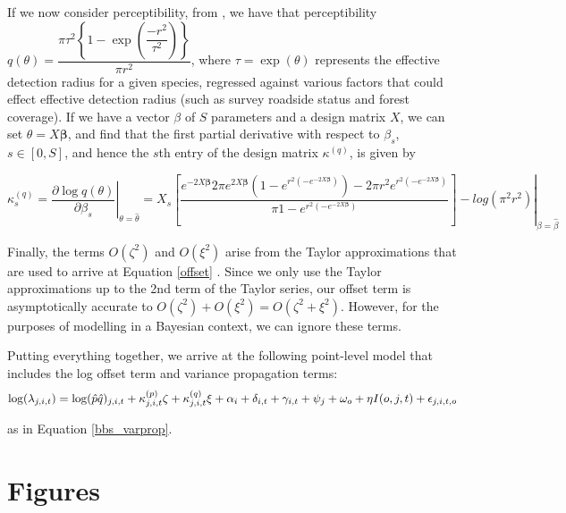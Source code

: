 \documentclass[12pt]{article}
\begin{document}
\par If we now consider perceptibility, from \citet{solymos_calibrating_2013}, we have that perceptibility $q(\theta) = \dfrac{\pi \tau^2 \left\{1 - \exp\left(\dfrac{-r^2}{\tau^2}\right)\right\}}{\pi r^2}$, where $\tau = \exp(\theta)$ represents the effective detection radius for a given species, regressed against various factors that could effect effective detection radius (such as survey roadside status and forest coverage). 
If we have a vector {\boldmath$\beta$} of $S$ parameters and a design matrix $X$, we can set $\theta = X\boldsymbol{\beta}$, and find that the first partial derivative with respect to $\beta_s$, $s \in \left[0, S\right]$, and hence the $s$th entry of the design matrix $\kappa^{(q)}$, is given by

\begin{equation*}\label{kappa_q}
	\kappa_{s}^{(q)} = \left. \dfrac{\partial \log q(\theta)}{\partial \beta_s} \right\vert_{\theta = \hat{\theta}}= \left. X_s \left[\dfrac{{e^{-2X\boldsymbol{\beta}}} {2 \pi  e^{2X\boldsymbol{\beta}}} {\left(1 - e^{r^2 \left(-e^{-2X\boldsymbol{\beta}}\right)}\right)} - {2\pi r^2} {e^{r^2 \left(-e^{-2X\boldsymbol{\beta}}\right)}}}             {\pi {1-e^{r^2 \left(-e^{-2X\boldsymbol{\beta}}\right)}}}\right]  - log(\pi^2r^2) \right\vert_{\beta = \hat{\beta}}
\end{equation*}

\par Finally, the terms $O(\zeta^2)$ and $O(\xi^2)$ arise from the Taylor approximations that are used to arrive at Equation \ref{offset} \citep{bravington_variance_2021}. 
Since we only use the Taylor approximations up to the 2nd term of the Taylor series, our offset term is asymptotically accurate to $O(\zeta^2) + O(\xi^2) = O(\zeta^2 + \xi^2)$.
However, for the purposes of modelling in a Bayesian context, we can ignore these terms.

Putting everything together, we arrive at the following point-level model that includes the log offset term and variance propagation terms:
\begin{equation*}
	\log(\lambda_{j,i,t}) = \log(\hat{p} \hat{q})_{j,i,t} + \kappa_{j,i,t}^{(p)}\zeta + \kappa_{j,i,t}^{(q)}\xi + \alpha_i + \delta_{i,t} + \gamma_{i,t} + \psi_j + \omega_o + \eta I(o,j,t) + \epsilon_{j,i,t,o} \\
\end{equation*}

as in Equation \ref{bbs_varprop}.

\section{Figures}
\end{document}
